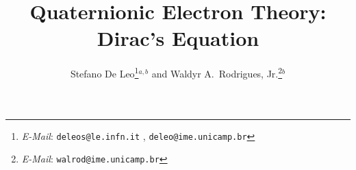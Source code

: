 

%
%
%
%                                  
%  
%
%
%  
%                                  
%                                  
%                             
%
%
%
%
%                 
%
%      
%                                       
%  
%

%
%
%
%
%
%







\draft
\preprint{}
\title{Quaternionic  Electron Theory:\\
       Dirac's Equation}
\author{Stefano De Leo\thanks{{\em E-Mail}: 
              {\tt deleos@le.infn.it} ,    
              {\tt deleo@ime.unicamp.br}    }$^{a,b}$ and   
        Waldyr A.~Rodrigues, Jr.\thanks{{\em E-Mail}:
              {\tt walrod@ime.unicamp.br}    }$^{b}$}
\address{$^{a}$Dipartimento di Fisica, 
                Universit\`a degli Studi Lecce and INFN, 
                Sezione di Lecce\\
                via Arnesano, CP 193, 73100 Lecce, Italia\\
                and\\ 
         $^{b}$Instituto de Matem\'atica, Estat\'{\i}stica e 
                Computa\c{c}\~ao Cient\'{\i}fica, IMECC-UNICAMP\\
                CP 6065, 13081-970, Campinas, S.P., Brasil} 
\date{}
\maketitle




